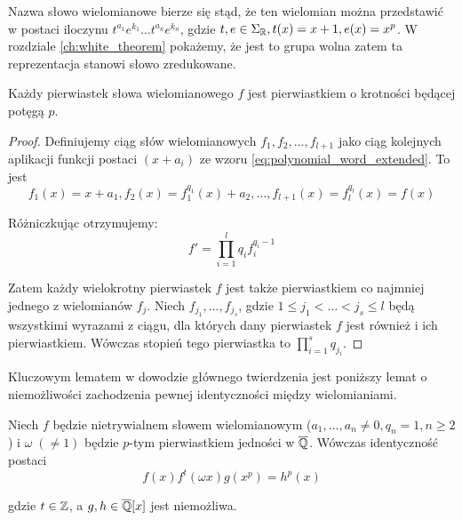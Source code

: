 Nazwa słowo wielomianowe bierze się stąd, że ten wielomian można przedstawić w
postaci iloczynu $t^{a_1}e^{k_1} \ldots t^{a_n}e^{k_n}$, gdzie $t, e \in
\Sigma_{\mathbb{R}}, t(x) = x + 1, e(x) = x^p$. W rozdziale \ref{ch:white_theorem}
pokażemy, że jest to grupa wolna zatem ta reprezentacja stanowi słowo
zredukowane.

\begin{lemma}
  Każdy pierwiastek słowa wielomianowego $f$ jest pierwiastkiem o krotności
  będącej potęgą $p$.
  \label{lem:multiplicity_lemma}
\end{lemma}

\begin{proof}
Definiujemy ciąg słów wielomianowych $f_1, f_2, \ldots, f_{l+1}$ jako ciąg
kolejnych aplikacji funkcji postaci $(x+a_i)$ ze wzoru
\ref{eq:polynomial_word_extended}.
To jest
\[f_1(x) = x + a_1, f_2(x) = f_1^{q_1}(x) + a_2, \ldots, f_{l+1}(x) =
f_l^{q_l}(x) = f(x)\]

Różniczkując otrzymujemy:
\[f' = \prod_{i=1}^l q_i f_i^{q_i - 1}\]

Zatem każdy wielokrotny pierwiastek $f$ jest także pierwiastkiem co najmniej
jednego z wielomianów $f_j$. Niech $f_{j_1}, \ldots, f_{j_s}$, gdzie $1 \leq j_1
< \ldots < j_s \leq l$ będą wszystkimi wyrazami z ciągu, dla których dany
pierwiastek $f$ jest również i ich pierwiastkiem. Wówczas stopień tego
pierwiastka to $\prod_{i=1}^s q_{j_i}$.
\end{proof}

Kluczowym lematem w dowodzie głównego twierdzenia jest poniższy lemat o
niemożliwości zachodzenia pewnej identyczności między wielomianiami.

\begin{lemma}
  Niech $f$ będzie nietrywialnem słowem wielomianowym ($a_1, \ldots, a_n \neq
  0, {q_n = 1,} {n \geq 2}$) i $\omega \; (\neq 1)$ będzie $p$-tym pierwiastkiem
  jedności w $\overline{\mathbb{Q}}$.  Wówczas identyczność postaci
  \begin{equation}
    f(x)f^t(\omega x)g\left(x^p\right) = h^p(x)
    \label{eq:polynomial_lemma}
  \end{equation}

  gdzie $t \in \mathbb{Z}$, a $g, h \in \overline{\mathbb{Q}}[x]$ jest niemożliwa.
  \label{lem:main_polynomial_lemma}
\end{lemma}

